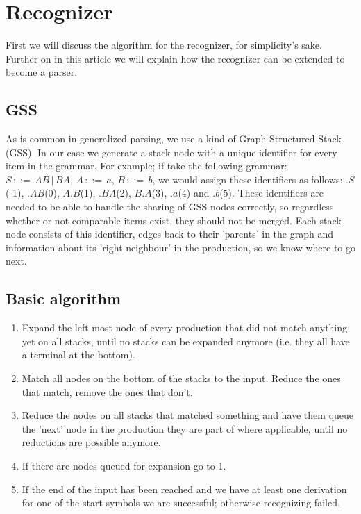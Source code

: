 \documentclass[a4paper,10pt]{article}
\begin{document}
\section{Recognizer}

First we will discuss the algorithm for the recognizer, for simplicity's sake. Further on in this article we will explain how the recognizer can be extended to become a parser.

\subsection{GSS}

As is common in generalized parsing, we use a kind of Graph Structured Stack (GSS). In our case we generate a stack node with a unique identifier for every item in the grammar. For example; if take the following grammar: $S\,::=\,AB\,|\,BA,\,A\,::=\,a,\,B\,::=\,b$, we would assign these identifiers as follows: $.S$(-1), $.AB$(0), $A.B$(1), $.BA$(2), $B.A$(3), $.a$(4) and $.b$(5). These identifiers are needed to be able to handle the sharing of GSS nodes correctly, so regardless whether or not comparable items exist, they should not be merged. Each stack node consists of this identifier, edges back to their 'parents' in the graph and information about its 'right neighbour' in the production, so we know where to go next.

\subsection{Basic algorithm}

\begin{enumerate}
 \setlength{\itemsep}{0pt}
 \setlength{\parskip}{0pt}
 \setlength{\parsep}{0pt}

 \item Expand the left most node of every production that did not match anything yet on all stacks, until no stacks can be expanded anymore (i.e. they all have a terminal at the bottom).
 \item Match all nodes on the bottom of the stacks to the input. Reduce the ones that match, remove the ones that don't.
 \item Reduce the nodes on all stacks that matched something and have them queue the 'next' node in the production they are part of where applicable, until no reductions are possible anymore.
 \item If there are nodes queued for expansion go to 1.
 \item If the end of the input has been reached and we have at least one derivation for one of the start symbols we are successful; otherwise recognizing failed.
\end{enumerate}
\end{document}
